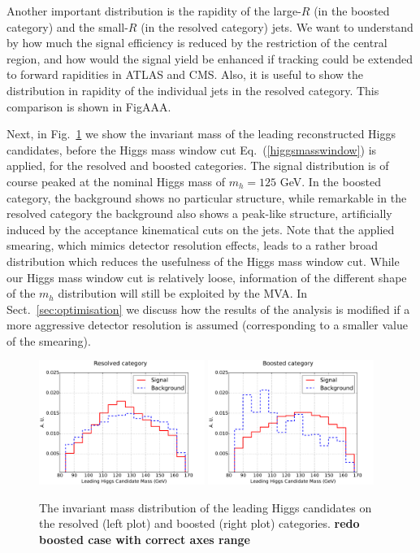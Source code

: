 Another important distribution is the rapidity of the large-$R$
(in the boosted category) and the small-$R$ (in the resolved
category) jets.
%
We want to understand by how much the signal efficiency is reduced
by the restriction of the central region, and how would
the signal yield be enhanced if tracking could be extended
to forward rapidities in ATLAS and CMS.
%
Also, it is useful to show the distribution in rapidity of the
individual jets in the resolved category.
%
This comparison is shown in FigAAA.




Next, in Fig.~\ref{fig:mHHinv} we show the invariant mass
of the leading reconstructed Higgs candidates, before the Higgs mass window
cut Eq.~(\ref{higgsmasswindow})
  is applied, for the resolved and boosted categories.
%
The signal distribution is of course peaked at the
nominal Higgs mass of $m_h=125$ GeV.
%
In the boosted category, the background shows no particular
structure, while remarkable in the resolved category the background
also shows a peak-like structure, artificially induced by the
acceptance kinematical cuts on the jets.
%
Note that the applied smearing, which mimics detector resolution effects,
leads to a rather broad distribution which reduces the usefulness
of the Higgs mass window cut.
%
While our Higgs mass window cut is relatively loose,
information of the different shape of the $m_{h}$
distribution will still be exploited by the MVA.
%
In Sect.~\ref{sec:optimisation} we discuss how the results
of the analysis is modified if a more aggressive
detector resolution is assumed (corresponding
to a smaller value of the smearing).

\begin{figure}[t]
\begin{center}
  \includegraphics[width=0.48\textwidth]{plots/m_H0_res_C1.pdf}
  \includegraphics[width=0.48\textwidth]{plots/m_H0_boost_C1.pdf}
  \caption{\small The invariant mass distribution of the leading
    Higgs candidates on the resolved (left plot) and boosted (right
    plot) categories. {\bf redo boosted case with correct axes range}
}
\label{fig:mHHinv}
\end{center}
\end{figure}


